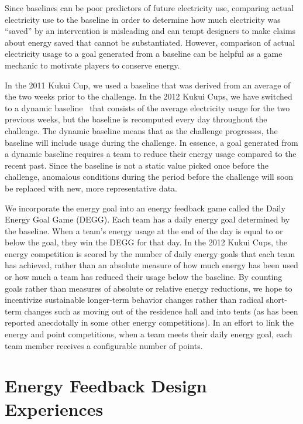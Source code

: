 \documentclass[10pt, conference, compsocconf]{IEEEtran-old}
\begin{document}
Since baselines can be poor predictors of future electricity use, comparing actual electricity use to the baseline in order to determine how much electricity was ``saved'' by an intervention is misleading and can tempt designers to make claims about energy saved that cannot be substantiated. However, comparison of actual electricity usage to a goal generated from a baseline can be helpful as a game mechanic to motivate players to conserve energy.

In the 2011 Kukui Cup, we used a baseline that was derived from an average of the two weeks prior to the challenge. In the 2012 Kukui Cups, we have switched to a dynamic baseline~\cite{csdl2-12-08} that consists of the average electricity usage for the two previous weeks, but the baseline is recomputed every day throughout the challenge. The dynamic baseline means that as the challenge progresses, the baseline will include usage during the challenge. In essence, a goal generated from a dynamic baseline requires a team to reduce their energy usage compared to the recent past. Since the baseline is not a static value picked once before the challenge, anomalous conditions during the period before the challenge will soon be replaced with new, more representative data.

We incorporate the energy goal into an energy feedback game called the Daily Energy Goal Game (DEGG). Each team has a daily energy goal determined by the baseline. When a team's energy usage at the end of the day is equal to or below the goal, they win the DEGG for that day. In the 2012 Kukui Cups, the energy competition is scored by the number of daily energy goals that each team has achieved, rather than an absolute measure of how much energy has been used or how much a team has reduced their usage below the baseline. By counting goals rather than measures of absolute or relative energy reductions, we hope to incentivize sustainable longer-term behavior changes rather than radical short-term changes such as moving out of the residence hall and into tents (as has been reported anecdotally in some other energy competitions). In an effort to link the energy and point competitions, when a team meets their daily energy goal, each team member receives a configurable number of points.


\section{Energy Feedback Design Experiences}
\end{document}
